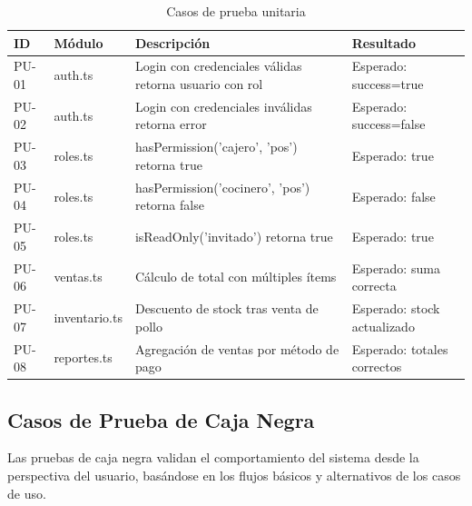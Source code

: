 \documentclass[12pt, a4paper]{article}
\begin{document}
\begin{table}[H]
\centering
\caption{Casos de prueba unitaria}
\begin{tabularx}{\textwidth}{|l|l|X|l|}
    \hline
    \textbf{ID} & \textbf{Módulo} & \textbf{Descripción} & \textbf{Resultado} \\ \hline
    PU-01 & auth.ts & Login con credenciales válidas retorna usuario con rol & Esperado: success=true \\ \hline
    PU-02 & auth.ts & Login con credenciales inválidas retorna error & Esperado: success=false \\ \hline
    PU-03 & roles.ts & hasPermission('cajero', 'pos') retorna true & Esperado: true \\ \hline
    PU-04 & roles.ts & hasPermission('cocinero', 'pos') retorna false & Esperado: false \\ \hline
    PU-05 & roles.ts & isReadOnly('invitado') retorna true & Esperado: true \\ \hline
    PU-06 & ventas.ts & Cálculo de total con múltiples ítems & Esperado: suma correcta \\ \hline
    PU-07 & inventario.ts & Descuento de stock tras venta de pollo & Esperado: stock actualizado \\ \hline
    PU-08 & reportes.ts & Agregación de ventas por método de pago & Esperado: totales correctos \\ \hline
\end{tabularx}
\end{table}

\subsection{Casos de Prueba de Caja Negra}

Las pruebas de caja negra validan el comportamiento del sistema desde la perspectiva del usuario, basándose en los flujos básicos y alternativos de los casos de uso.
\end{document}

